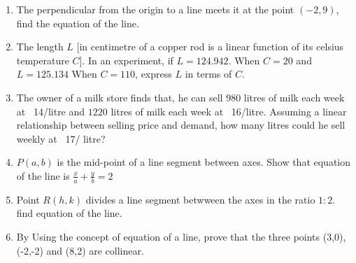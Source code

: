 \documentclass{article}
\theoremstyle{remark}
\begin{document}
\begin{enumerate}
\item The perpendicular from the origin to a line meets it at the point $(-2,9)$, find the equation of the line.
\item The length $L$ [in centimetre of a copper rod is a linear function of its celsius temperature $C$]. In an experiment, if $L=124.942$. When $C=20$  and $L=125.134$ When $C=110$, express $L$ in terms of $C$.
\item The owner of a milk store finds that, he can sell $980$ litres of milk each week at \rupee~14/litre and $1220$ litres of milk each week at \rupee~16/litre. Assuming a linear relationship between selling price and demand, how many litres could he sell weekly at \rupee~17/ litre?
\item $P(a,b)$ is the mid-point of a line segment between axes. Show that equation of the line is $\frac{x}{a}+\frac{y}{b}=2$
\item Point $R(h,k)$ divides a line segment betwween the axes in the ratio $1:2$. find equation of the line.
\item By Using the concept of equation of a line, prove that the three points (3,0), (-2,-2) and (8,2) are collinear.
\end{enumerate}
\end{document}

